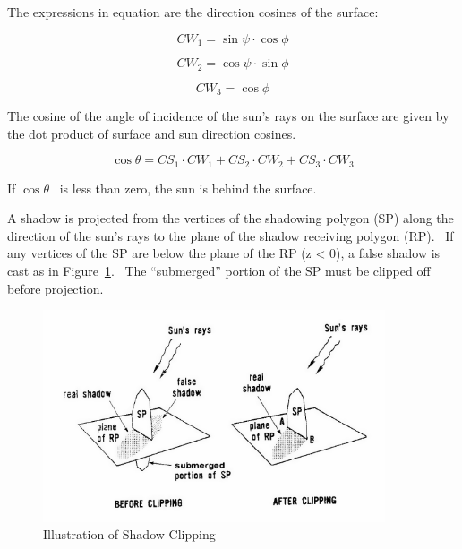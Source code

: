 The expressions in equation are the direction cosines of the surface:

\begin{equation}
C{W_1} = \sin \psi \cdot \cos \phi
\end{equation}

\begin{equation}
C{W_2} = \cos \psi \cdot \sin \phi
\end{equation}

\begin{equation}
C{W_3} = \cos \phi
\end{equation}

The cosine of the angle of incidence of the sun's rays on the surface are given by the dot product of surface and sun direction cosines.

\begin{equation}
\cos \theta  = C{S_1}\cdot C{W_1} + C{S_2}\cdot C{W_2} + C{S_3}\cdot C{W_3}
\end{equation}

If \(\cos \theta\) ~is less than zero, the sun is behind the surface.

A shadow is projected from the vertices of the shadowing polygon (SP) along the direction of the sun's rays to the plane of the shadow receiving polygon (RP).~ If any vertices of the SP are below the plane of the RP (z \textless{} 0), a false shadow is cast as in Figure~\ref{fig:illustration-of-shadow-clipping}.~ The ``submerged'' portion of the SP must be clipped off before projection.

\begin{figure}[hbtp] %
\centering
\includegraphics[width=0.9\textwidth, height=0.9\textheight, keepaspectratio=true]{media/image628.png}
\caption{  Illustration of Shadow Clipping \protect \label{fig:illustration-of-shadow-clipping}}
\end{figure}

